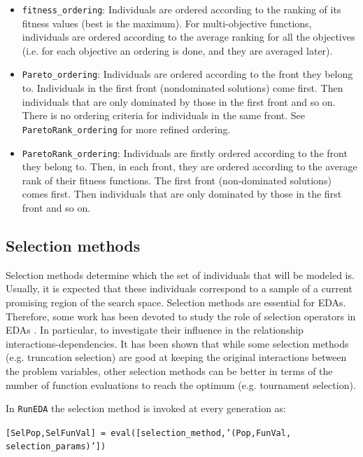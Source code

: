 \documentclass[a4paper]{article}
\begin{document}
\begin{itemize}
 \item \texttt{fitness\_ordering}: Individuals are ordered according to the ranking of its fitness values (best is the
 maximum).
 For multi-objective functions, individuals are ordered according to the average ranking for all the objectives (i.e. for each objective an ordering
 is done, and they are averaged later).
 \item \texttt{Pareto\_ordering}:  Individuals are ordered according to the front they belong to. Individuals in
 the first front (nondominated solutions) come first. Then individuals that
 are  only  dominated by those in the first front and so on. There is no ordering criteria
 for individuals in the same front. See \texttt{ParetoRank\_ordering} for more refined
 ordering.
 \item \texttt{ParetoRank\_ordering}: Individuals are firstly ordered according to the front they belong to.
 Then, in each front, they are ordered according to the average rank of their fitness functions. The first front (non-dominated solutions) comes first. Then individuals that are only
 dominated by those in the first front and so on.
\end{itemize}



\subsection{Selection methods}

Selection methods determine which the set of individuals that will
be modeled is. Usually, it is expected that these individuals
correspond to a sample of a current promising region of the search
space. Selection methods are essential for EDAs.  Therefore, some
work has been devoted to study the
 role of selection operators in EDAs
\cite{Johnson_and_Shapiro:2002,Lima_et_al:2007,Mahnig_and_Muehlenbein:2001,Santana_et_al:2005b}.
In  particular, to investigate
 their influence in  the relationship
 interactions-dependencies. It has been shown \cite{Lima_et_al:2007} that while some
 selection methods (e.g. truncation selection) are good at keeping the
 original interactions between the problem variables,  other selection methods can be better in terms of the
 number of function evaluations to reach the optimum (e.g. tournament selection).


In  \texttt{RunEDA} the selection method  is invoked at every
generation as:

  \texttt{[SelPop,SelFunVal]  = eval([selection\_method,'(Pop,FunVal,\\
   selection\_params)'])}
\end{document}
